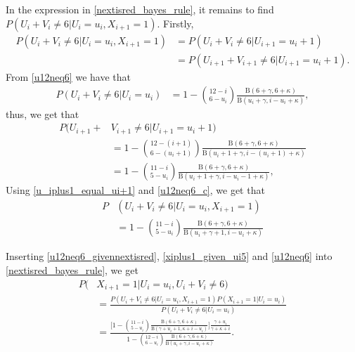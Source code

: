 In the expression in \eqref{nextisred_bayes_rule}, it remains to find $P(U_i+V_i\neq6|U_i=u_i,X_{i+1}=1)$.
Firstly, 
\begin{equation}
\label{u_iplus1_equal_ui+1}
    \begin{aligned}
        P(U_i+V_i\neq6|U_i=u_i,X_{i+1}=1) 
        &= P(U_i+V_i\neq6|U_{i+1}=u_i+1)
        \\[6pt]
        &= P(U_{i+1}+V_{i+1}\neq6|U_{i+1}=u_i+1).
    \end{aligned}
\end{equation}
From \eqref{u12neq6} we have that
\begin{equation}
\label{u12neq6_b}
    \begin{aligned}
        P(U_i+V_i\neq6|U_i=u_i) 
        &= 1-\binom{12-i}{6-u_i} \frac{\text{B}(6+\gamma,6+\kappa)}{\text{B}(u_i+\gamma,i-u_i+\kappa)},
    \end{aligned}
\end{equation}
thus, we get that
\begin{equation}
\label{u12neq6_c}
    \begin{aligned}
        P(U_{i+1}+&V_{i+1}\neq6|U_{i+1}=u_i+1) \\[6pt]
        &= 1-\binom{12-(i+1)}{6-(u_i+1)} \frac{\text{B}(6+\gamma,6+\kappa)}{\text{B}(u_i+1+\gamma,i-(u_i+1)+\kappa)}\\[6pt]
        &= 1-\binom{11-i}{5-u_i} \frac{\text{B}(6+\gamma,6+\kappa)}{\text{B}(u_i+1+\gamma,i-u_i-1+\kappa)},
    \end{aligned}
\end{equation}
Using \eqref{u_iplus1_equal_ui+1} and \eqref{u12neq6_c}, we get that 
\begin{equation}
\label{u12neq6_givennextisred}
    \begin{aligned}
        P&(U_i+V_i\neq6|U_i=u_i,X_{i+1}=1)\\[6pt] 
        &= 1-\binom{11-i}{5-u_i} \frac{\text{B}(6+\gamma,6+\kappa)}{\text{B}(u_i+\gamma+1,i-u_i+\kappa)}
    \end{aligned}
\end{equation}

Inserting \eqref{u12neq6_givennextisred}, \eqref{xiplus1_given_ui5} and \eqref{u12neq6} into \eqref{nextisred_bayes_rule}, we get
\begin{equation}
\label{nextisred_given_majority}
    \begin{aligned}
        P(&X_{i+1}=1|U_i=u_i,U_i+V_i\neq6) \\[6pt]
        &= \frac{P(U_i+V_i\neq6|U_i=u_i,X_{i+1}=1)P(X_{i+1}=1|U_i=u_i)}
        {P(U_i+V_i\neq6|U_i=u_i)}\\[6pt]
        &= \frac{\bigg[ 1 - \binom{11-i}{5-u_i}\frac{\text{B}(6+\gamma,6+\kappa)}{\text{B}(\gamma+u_i+1,\kappa+i-u_i)} \bigg]
        \frac{\gamma+u_i}
        {\gamma+\kappa+i}}
        {1-\binom{12-i}{6-u_i} \frac{\text{B}(6+\gamma,6+\kappa)}{\text{B}(u_i+\gamma,i-u_i+\kappa)}}.
    \end{aligned}
\end{equation}

